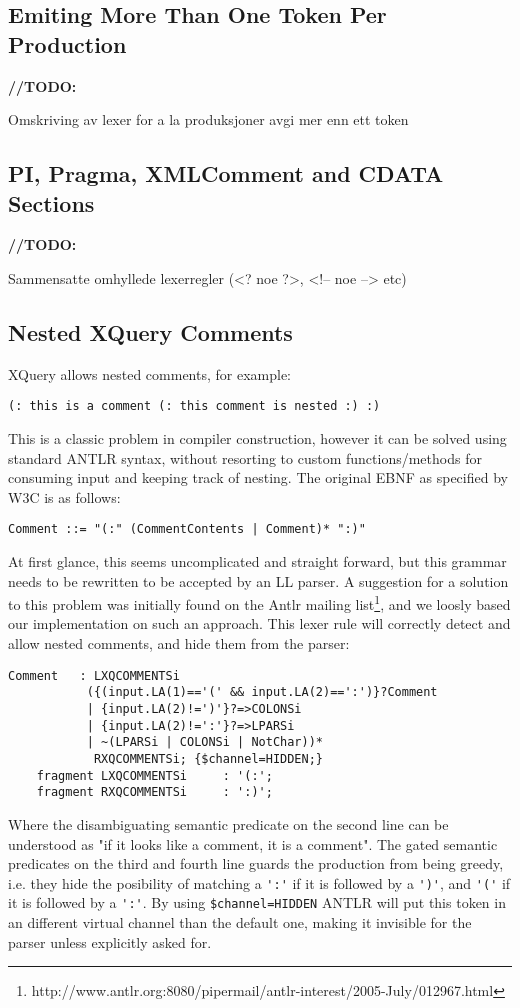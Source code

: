 \subsection{Emiting More Than One Token Per Production}
\textbf{\LARGE //TODO:} 

Omskriving av lexer for a la produksjoner avgi mer enn ett token

\subsection{PI, Pragma, XMLComment and CDATA Sections}
\textbf{\LARGE //TODO:} 

Sammensatte omhyllede lexerregler (<? noe ?>, <!-- noe --> etc)

\subsection{Nested XQuery Comments}
XQuery allows nested comments, for example:
\begin{verbatim}
(: this is a comment (: this comment is nested :) :)
\end{verbatim}
This is a classic problem in compiler construction, however it can be solved using standard ANTLR syntax, without resorting to custom functions/methods for consuming input and keeping track of nesting. The original EBNF as specified by W3C is as follows:
\begin{verbatim}
Comment ::= "(:" (CommentContents | Comment)* ":)"
\end{verbatim}
At first glance, this seems uncomplicated and straight forward, but this grammar needs to be rewritten to be accepted by an LL parser. A suggestion for a solution to this problem was initially found on the Antlr mailing list\footnote{http://www.antlr.org:8080/pipermail/antlr-interest/2005-July/012967.html}, and we loosly based our implementation on such an approach. This lexer rule will correctly detect and allow nested comments, and hide them from the parser:
\begin{verbatim}   
Comment   : LXQCOMMENTSi 
           ({(input.LA(1)=='(' && input.LA(2)==':')}?Comment 
           | {input.LA(2)!=')'}?=>COLONSi
           | {input.LA(2)!=':'}?=>LPARSi
           | ~(LPARSi | COLONSi | NotChar))*
            RXQCOMMENTSi; {$channel=HIDDEN;}
    fragment LXQCOMMENTSi     : '(:';
    fragment RXQCOMMENTSi     : ':)';
\end{verbatim}
Where the disambiguating semantic predicate on the second line can be understood as "if it looks like a comment, it is a comment". The gated semantic predicates on the third and fourth line guards the production from being greedy, i.e. they hide the posibility of matching a \verb!':'! if it is followed by a \verb!')'!, and \verb!'('! if it is followed by a \verb!':'!. By using \verb!$channel=HIDDEN! ANTLR will put this token in an different virtual channel than the default one, making it invisible for the parser unless explicitly asked for. 

